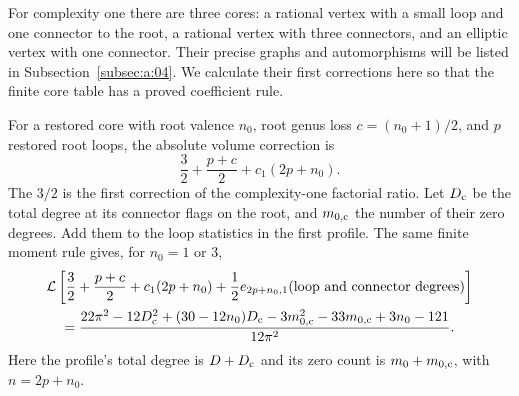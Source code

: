 For complexity one there are three cores: a rational vertex with a
small loop and one connector to the root, a rational vertex with three
connectors, and an elliptic vertex with one connector. Their precise
graphs and automorphisms will be listed in
Subsection~\ref{subsec:a:04}. We calculate their first corrections
here so that the finite core table has a proved coefficient rule.

For a restored core with root valence $n_0$, root genus loss
$c=(n_0+1)/2$, and $p$ restored root loops, the absolute volume
correction is
\[
 \frac32+\frac{p+c}{2}+c_1(2p+n_0).
\]
The $3/2$ is the first correction of the complexity-one factorial
ratio. Let $D_{\rm c}$ be the total degree at its connector flags on
the root, and $m_{0,\rm c}$ the number of their zero degrees. Add them
to the loop statistics in the first profile. The same finite moment
rule gives, for $n_0=1$ or $3$,
\begin{align}
 &\mathcal L\left[\frac32+\frac{p+c}{2}+c_1(2p+n_0)
       +\frac12e_{2p+n_0,1}(\text{loop and connector degrees})\right]
 \notag\\
 &\quad=\frac{22\pi^2-12D_{\rm c}^2+(30-12n_0)D_{\rm c}
      -3m_{0,\rm c}^2-33m_{0,\rm c}+3n_0-121}{12\pi^2}.
 \label{eq:a:q-one-loop-average}
\end{align}
Here the profile's total degree is $D+D_{\rm c}$ and its zero count
is $m_0+m_{0,\rm c}$, with $n=2p+n_0$.

